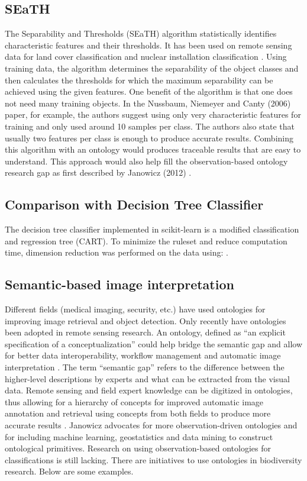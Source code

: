 \documentclass[authoryear, review,12pt,number]{elsarticle}
\begin{document}
\subsection{SEaTH} The Separability and Thresholds (SEaTH) algorithm
\citep{Nussbaum2006} statistically identifies characteristic features and their thresholds. It has
been used on remote sensing data for land cover classification \citep{Gao2011}
and nuclear installation classification \citep{Nussbaum2006}.
Using training data, the algorithm determines the separability of the object
classes and then calculates the thresholds for which the maximum separability
can be achieved using the given features. One benefit of the algorithm is that
one does not need many training objects.
In the Nussbaum, Niemeyer and Canty (2006) paper, for example, the authors
suggest using only very characteristic features for training and only used
around 10 samples per class\citep{Nussbaum2006}. The authors also state that
usually two features per class is enough to produce accurate results. Combining
this algorithm with an ontology would produces traceable results that are easy
to understand. This approach would also help fill the observation-based ontology
research gap as first described by Janowicz (2012) \citep{Janowicz2012}.

\subsection{Comparison with Decision Tree Classifier}
The decision tree classifier implemented in scikit-learn is a modified
classification and regression tree (CART)\citep{scikit-learn}. To minimize the
ruleset and reduce computation time, dimension reduction was performed on the
data using: . 

\subsection{Semantic-based image interpretation}
Different fields (medical imaging, security, etc.) have used ontologies for
improving image retrieval and object detection. Only recently have ontologies
been adopted in remote sensing research. An ontology, defined as ``an explicit
specification of a conceptualization'' \citep{gruber1993} could help bridge the
semantic gap and allow for better data interoperability, workflow management and
automatic image interpretation \citep{Arvor2013} \citep{Andres2013a}. The term
``semantic gap'' refers to the difference between the higher-level descriptions
by experts and what can be extracted from the visual data. Remote sensing and
field expert knowledge can be digitized in ontologies, thus allowing for a
hierarchy of concepts for improved automatic image annotation and retrieval
using concepts from both fields to produce more accurate results
\citep{Srikanth:2005:EOA:1076034.1076128}. Janowicz \citep{Janowicz2012}
advocates for more observation-driven ontologies and for including machine
learning, geostatistics and data mining to construct ontological primitives.
Research on using observation-based ontologies for classifications is still
lacking. There are initiatives to use ontologies in biodiversity research. Below
are some examples.
\end{document}
